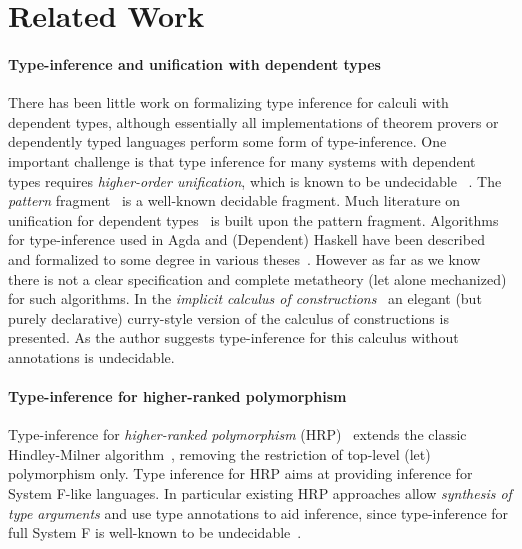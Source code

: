 \section{Related Work}

\paragraph{Type-inference and unification with dependent types}
There has been little work on formalizing type inference for calculi
with dependent types, although essentially all implementations of
theorem provers or dependently typed languages perform some form of
type-inference. 
One important challenge is that type inference for
many systems with dependent types requires \emph{higher-order unification},
which is known to be undecidable
~\cite{goldfarb1981undecidability}. The \textit{pattern}
fragment~\cite{miller1991unification} is a well-known decidable
fragment. Much literature on unification for dependent
types~\cite{reed2009higher,abel2011higher, gundry2013tutorial, Cockx:2016:UEP:2951913.2951917, ziliani2015unification, coen2004mathematical} is
built upon the pattern fragment. Algorithms for type-inference used in Agda and
(Dependent) Haskell have been described and formalized to some degree 
in various theses~\cite{norell,gundry,dh}. However as far as we know
there is not a clear specification and complete metatheory (let alone 
mechanized) for such algorithms. In the \emph{implicit calculus of
 constructions}~\cite{Miquel01} an elegant (but purely declarative) curry-style
version of the calculus of constructions is presented. As the author 
suggests type-inference for this calculus without annotations is undecidable.

\paragraph{Type-inference for higher-ranked polymorphism}
Type-inference for \emph{higher-ranked polymorphism}
(HRP)~\cite{dunfield2013complete,le2003ml,leijen2008hmf,vytiniotis2008fph,jones2007practical,Serrano2018, odersky1996putting}
extends the classic Hindley-Milner algorithm~\cite{hindley1969principal,milner1978theory,damas1982principal},
removing the restriction of top-level (let) polymorphism only. Type
inference for HRP aims at providing inference for System F-like
languages. In particular existing HRP approaches allow \emph{synthesis of type arguments} 
and use type annotations to aid 
inference, since type-inference for full System F is
well-known to be undecidable~\cite{wells1999typability}.

